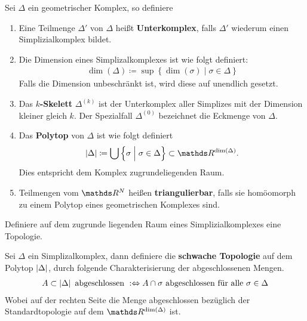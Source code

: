 \begin{Def}
  Sei $\Delta$ ein geometrischer Komplex, so definiere
  \begin{enumerate}[(1)]
  \item Eine Teilmenge $\Delta'$ von $\Delta$ heißt
    \textbf{Unterkomplex}, falls $\Delta'$ wiederum einen
    Simplizialkomplex bildet.
  \item Die Dimension eines Simplizalkomplexes ist wie folgt
    definiert:
    \begin{gather*}
      \dim(\Delta) \coloneqq \sup \left\{ \dim(\sigma) \; \Big| \;
        \sigma \in \Delta \right\}
    \end{gather*}
    Falls die Dimension unbeschränkt ist, wird diese auf unendlich
    gesetzt.
  \item Das \textbf{$k$-Skelett} $\Delta^{(k)}$ ist der Unterkomplex
    aller Simplizes mit der Dimension kleiner gleich $k$. Der
    Spezialfall $\Delta^{(0)}$ bezeichnet die Eckmenge von $\Delta$.
  \item Das \textbf{Polytop} von $\Delta$ ist wie folgt definiert
    \begin{gather*}
      |\Delta| \coloneqq \bigcup \left\{ \sigma \; \Big| \; \sigma \in
        \Delta \right\} \subset \R^{\dim(\Delta)}.
    \end{gather*}
    Dies entspricht dem Komplex zugrundeliegenden Raum.
  \item Teilmengen vom $\R^N$ heißen \textbf{triangulierbar}, falls
    sie homöomorph zu einem Polytop eines geometrischen Komplexes sind.
  \end{enumerate}
\end{Def}



Definiere auf dem zugrunde liegenden Raum eines Simplizialkomplexes eine 
Topologie.

\begin{Def}
	Sei $\Delta$ ein Simplizalkomplex, dann definiere die
	\textbf{schwache Topologie} auf dem Polytop $\left| \Delta \right|$,
	durch folgende Charakterisierung der abgeschlossenen Mengen.
	\begin{gather*}
          A \subset \left| \Delta \right| \text{ abgeschlossen }
          :\Leftrightarrow A \cap \sigma \text{ abgeschlossen für alle
          } \sigma \in \Delta
	\end{gather*}
	Wobei auf der rechten Seite die Menge abgeschlossen bezüglich der
	Standardtopologie auf dem $\R^{\dim(\Delta)}$ ist.
\end{Def}

